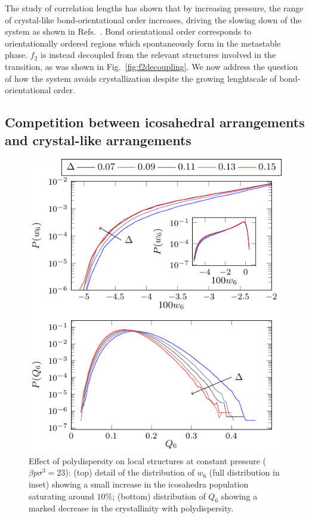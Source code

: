 \documentclass[twocolumn,superscriptaddress]{revtex4}
\begin{document}
The study of correlation lengths has shown that by increasing pressure, the range of
crystal-like bond-orientational order increases, driving the slowing down of the system as shown in Refs.~\cite{tanaka,mathieu_icosahedra}. 
Bond orientational order corresponds to
orientationally ordered regions which spontaneously form in the metastable phase.
$f_2$ is instead decoupled from the relevant structures involved in the transition, as
was shown in Fig.~\ref{fig:f2decoupling}. We now address the question of how the system avoids crystallization
despite the growing lenghtscale of bond-orientational order.


\subsection{Competition between icosahedral arrangements and crystal-like arrangements}\label{sec:icosahedra}

\begin{figure}
 \centering
 \includegraphics{fig_polydistrib}
 \caption{Effect of polydispersity on local structures at constant pressure ($\beta p\sigma^3=23$): (top) detail of the distribution of $w_6$ (full distribution in inset) showing a small increase in the icosahedra population saturating around $10\%$; (bottom) distribution of $Q_6$ showing a marked decrease in the crystallinity with polydispersity.}
 \label{fig:polydispersity}
\end{figure}
\end{document}
